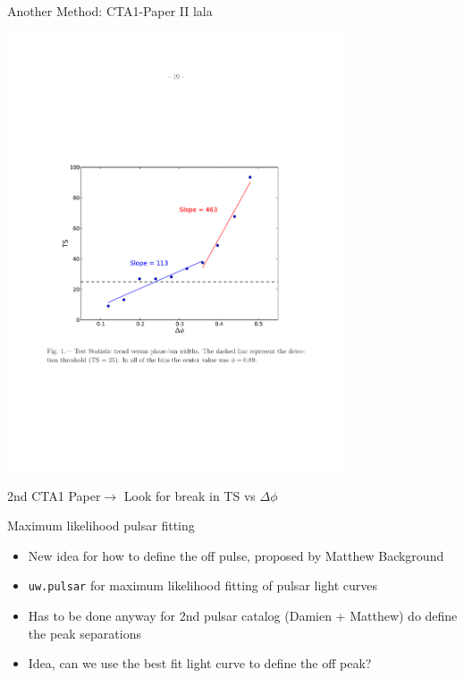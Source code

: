 \documentclass[12pt]{beamer}
\begin{document}
\begin{frame}{Another Method: CTA1-Paper II}
  lala

  \includegraphics[width=0.75\textwidth]{plots/cta1.pdf}

  2nd CTA1 Paper$\rightarrow$ Look for break in TS vs $\Delta \phi$

\end{frame}

\begin{frame}{Maximum likelihood pulsar fitting}
  \begin{itemize}
    \item New idea for how to define the off pulse, proposed by Matthew
Background
   \item \texttt{uw.pulsar} for maximum likelihood fitting of pulsar light curves
   \item Has to be done anyway for 2nd pulsar catalog (Damien + Matthew)
     do define the peak separations
   \item Idea, can we use the best fit light curve to define the off peak?
  \end{itemize}
\end{frame}
\end{document}
